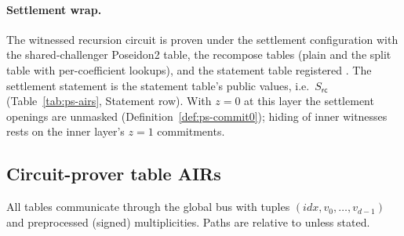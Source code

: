 \paragraph{Settlement wrap.} The witnessed recursion circuit is proven under the
settlement configuration with the shared-challenger Poseidon2 table, the
recompose tables (plain and the split  table with per-coefficient lookups), and the statement table registered
. The settlement statement is
the statement table's public values, i.e.\ $S_{\mathsf{rc}}$
(Table~\ref{tab:ps-airs}, Statement row). With $z=0$ at this layer the
settlement openings are unmasked (Definition~\ref{def:ps-commit0}); hiding of
inner witnesses rests on the inner layer's $z=1$ commitments.

\subsection{Circuit-prover table AIRs}
\label{subsec:ps-airs}

All tables communicate through the global  bus with tuples
$(\mathit{idx}, v_0,\dots,v_{d-1})$ and preprocessed (signed) multiplicities.
Paths are relative to  unless
stated.

